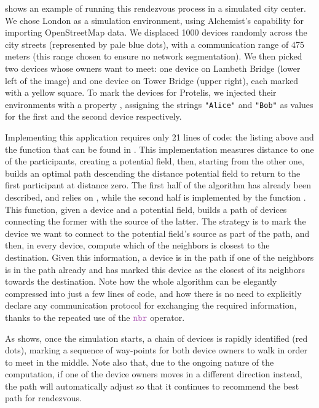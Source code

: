 \documentclass[12pt,a4paper,twoside,openright]{book}
\begin{document}
 shows an example of running this rendezvous process in a simulated city center.
%
We chose London as a simulation environment, using Alchemist's capability for importing OpenStreetMap data.
%
We displaced 1000 devices randomly across the city streets (represented by pale blue dots), with a communication range of 475 meters (this range chosen to ensure no network segmentation).
%
We then picked two devices whose owners want to meet: one device on Lambeth Bridge (lower left of the image) and one device on Tower Bridge (upper right), each marked with a yellow square.
%
To mark the devices for Protelis, we injected their environments with a property \texttt{}, assigning the strings \texttt{"Alice"} and \texttt{"Bob"} as values for the first and the second device respectively.

Implementing this application requires only 21 lines of code: the listing above and the function \texttt{} that can be found in .
%
This implementation measures distance to one of the participants, creating a potential field, then, starting from the other one, builds an optimal path descending the distance potential field to return to the first participant at distance zero.
%
The first half of the algorithm has already been described, and relies on \texttt{}, while the second half is implemented by the function \texttt{}.
%
This function, given a device and a potential field, builds a path of devices connecting the former with the source of the latter.
%
The strategy is to mark the device we want to connect to the potential field's source as part of the path, and then, in every device, compute which of the neighbors is closest to the destination.
%
Given this information, a device is in the path if one of the neighbors is in the path already and has marked this device as the closest of its neighbors towards the destination.
%
Note how the whole algorithm can be elegantly compressed into just a few lines of code, and how there is no need to explicitly declare any communication protocol for exchanging the required information, thanks to the repeated use of the $\nbrK$ operator.

As  shows, once the simulation starts, a chain of devices is rapidly identified (red dots), marking a sequence of way-points for both device owners to walk in order to meet in the middle.
%
Note also that, due to the ongoing nature of the computation, if one of the device owners moves in a different direction instead, the path will automatically adjust so that it continues to recommend the best path for rendezvous.
\end{document}
